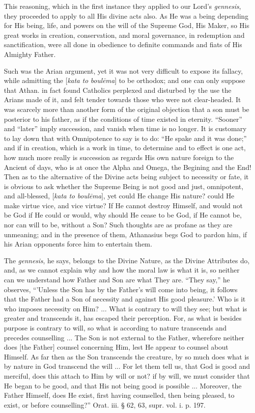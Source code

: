 This reasoning, which in the first instance they
applied to our Lord’s \emph{gennesis}, they proceeded to apply to
all His divine acts also. As He was a being depending for His being,
life, and powers on the will of the Supreme God, His Maker, so His
great works in creation, conservation, and moral governance, in
redemption and sanctification, were all done in obedience to definite
commands and fiats of His Almighty Father.

Such was the Arian argument, yet it was not very
difficult to expose its fallacy, while admitting the [\emph{kata to boul\={e}ma}]
to be orthodox; and one can only suppose that Athan. in fact found
Catholics perplexed and disturbed by the use the Arians made of it,
and felt tender towards those who were not clear-headed. It was
scarcely more than another form of the original objection that a
son must be posterior to his father, as if the conditions of time
existed in eternity. “Sooner” and “later” imply succession,
and vanish when time is no longer. It is customary to lay down that
with Omnipotence to say is to do: “He spake and it was done;” and
if in creation, which is a work in time, to determine and to effect is
one act, how much more really is succession as regards His own nature
foreign to the Ancient of days, who is at once the Alpha and Omega,
the Begining and the End! Then as to the alternative of the Divine
acts being subject to necessity or fate, it is obvious to ask whether
the Supreme Being is not good and just, omnipotent, and all-blessed, [\emph{kata
to boul\={e}ma}], yet could He change His nature? could He make
virtue vice, and vice virtue? If He cannot destroy Himself, and would
not be God if He could or would, why should He cease to be God, if He
cannot be, nor can will to be, without a Son? Such thoughts are as
profane as they are unmeaning; and in the presence of them, Athanasius
begs God to pardon him, if his Arian opponents force him to entertain
them.

The \emph{gennesis}, he says, belongs to the
Divine Nature, as the Divine Attributes do, and, as we cannot explain
why and how the moral law is what it is, so neither can we understand
how Father and Son are what They are. “They say,” he observes,
“'Unless the Son has by the Father’s will come into being, it
follows that the Father had a Son of necessity and against His good
pleasure.' Who is it who imposes necessity on Him? ... What is
contrary to will they see; but what is greater and transcends it, has
escaped their perception. For, as what is besides purpose is
contrary to will, so what is according to nature transcends and
precedes counselling ... The Son is not external to the Father,
wherefore neither does [the Father] counsel concerning Him, lest He
appear to counsel about Himself. As far then as the Son transcends the
creature, by so much does what is by nature in God transcend the will
... For let them tell us, that God is good and merciful, does this
attach to Him by will or not? if by will, we must consider that He
began to be good, and that His not being good is possible ...
Moreover, the Father Himself, does He exist, first having counselled,
then being pleased, to exist, or before counselling?” Orat. iii. §
62, 63, supr. vol. i. p. 197.

